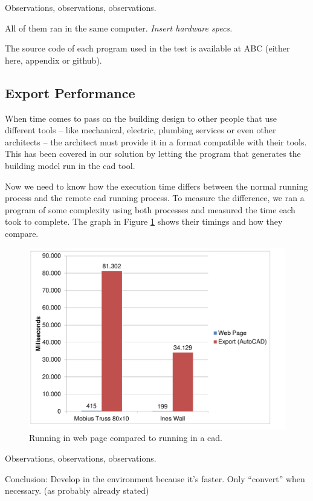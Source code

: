 Observations, observations, observations.

All of them ran in the same computer.
{\it Insert hardware specs.}

The source code of each program used in the test is available at ABC (either here, appendix or github).


\subsection{Export Performance}
When time comes to pass on the building design to other people that use different tools -- like mechanical, electric, plumbing services or even other architects -- the architect must provide it in a format compatible with their tools.
This has been covered in our solution by letting the program that generates the building model run in the \gls{cad} tool.

Now we need to know how the execution time differs between the normal running process and the remote \gls{cad} running process.
To measure the difference, we ran a program of some complexity using both processes and measured the time each took to complete.
The graph in Figure \ref{fig:local:remote:timing} shows their timings and how they compare.

\begin{figure}
  \centering
  \includegraphics[width=12cm]{./images/local_remote_timing}
  \caption{Running in web page compared to running in a \gls{cad}.}
  \label{fig:local:remote:timing}
\end{figure}

Observations, observations, observations.

Conclusion: Develop in the environment because it's faster. Only ``convert'' when necessary. (as probably already stated)


